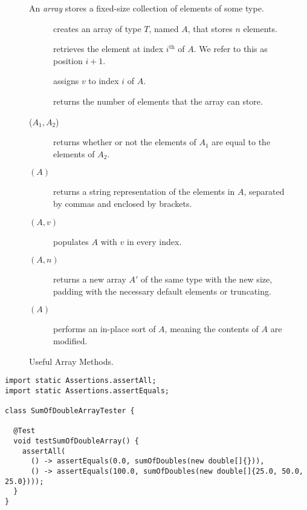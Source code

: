 \begin{figure}[tp]
  \small
  \begin{tcolorbox}[title=Java Arrays]
    An \emph{array} stores a fixed-size collection of elements of some type.
    \vspace{2ex}
  \begin{description}
    \item [] creates an array of type $T$, named $A$, that stores $n$ elements.
    \item [] retrieves the element at index $i^{\text{th}}$ of $A$. We refer to this as position $i + 1$.
    \item [] assigns $v$ to index $i$ of $A$.
    \item [] returns the number of elements that the array can store.
    \item [($A_1, A_2$)] returns whether or not the elements of $A_1$ are equal to the elements of $A_2$.
    \item [$(A)$] returns a string representation of the elements in $A$, separated by commas and enclosed by brackets.
    \item [$(A, v)$] populates $A$ with $v$ in every index.
    \item [$(A, n)$] returns a new array $A'$ of the same type with the new size, padding with the necessary default elements or truncating.
    \item [$(A)$] performs an in-place sort of $A$, meaning the contents of $A$ are modified.
  \end{description}
\end{tcolorbox}
  \caption{Useful Array Methods.}
  \label{fig:arrays}
\end{figure}

\enlargethispage{-4\baselineskip}

\begin{lstlisting}[language=MyJava]
import static Assertions.assertAll;
import static Assertions.assertEquals;

class SumOfDoubleArrayTester {

  @Test
  void testSumOfDoubleArray() {
    assertAll(
      () -> assertEquals(0.0, sumOfDoubles(new double[]{})),
      () -> assertEquals(100.0, sumOfDoubles(new double[]{25.0, 50.0, 25.0})));
  }
}
\end{lstlisting}

